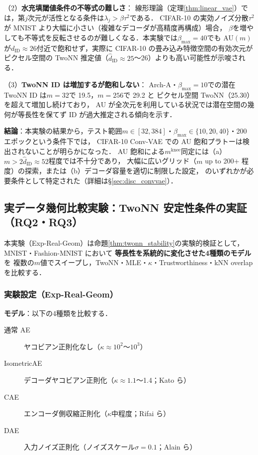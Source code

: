 \documentclass[11pt,a4paper]{jsarticle}
\newcommand{\kap}{\kappa}
\newcommand{\mknee}{m^{\mathrm{knee}}}
\begin{document}
（2）\textbf{水充填閾値条件の不等式の難しさ}：
線形理論（定理\ref{thm:linear_vae}）では，第$j$次元が活性となる条件は$\lambda_j > \beta \tau^2$である．
CIFAR-10 の実効ノイズ分散$\tau^2$が MNIST より大幅に小さい（複雑なデコーダが高精度再構成）場合，
$\beta$を増やしても不等式を反転させるのが難しくなる．本実験では$\beta_{\max}=40$でも
AU$(m)$が$d_{\mathrm{ID}} \approx 26$付近で飽和せず，実際に CIFAR-10 の畳み込み特徴空間の有効次元が
ピクセル空間の TwoNN 推定値（$\hat{d}_{\mathrm{ID}} \approx 25$〜26）よりも高い可能性が示唆される．

（3）\textbf{TwoNN ID は増加するが飽和しない}：
Arch-A・$\beta_{\max}=10$での潜在 TwoNN ID は$m=32$で 19.5，$m=256$で 29.2 と
ピクセル空間 TwoNN（25.30）を超えて増加し続けており，
AU が全次元を利用している状況では潜在空間の幾何が等長性を保てず ID が過大推定される傾向を示す．

\textbf{結論}：本実験の結果から，テスト範囲$m \in [32, 384]$・$\beta_{\max} \in \{10, 20, 40\}$・200 エポックという条件下では，
CIFAR-10 Conv-VAE での AU 飽和プラトーは検出されないことが明らかになった．
AU 飽和による$\mknee$同定には（a）$m > 2\hat{d}_{\mathrm{ID}} \approx 52$程度では不十分であり，
大幅に広いグリッド（$m$ up to 200+ 程度）の探索，または（b）デコーダ容量を適切に制限した設定，
のいずれかが必要条件として特定された（詳細は§\ref{sec:disc_convvae}）．

\subsection{実データ幾何比較実験：TwoNN 安定性条件の実証（RQ2・RQ3）}\label{sec:exp_real_geom}

本実験（Exp-Real-Geom）は命題\ref{thm:twonn_stability}の実験的検証として，
MNIST・Fashion-MNIST において \textbf{等長性を系統的に変化させた4種類のモデル}を
複数の$m$値でスイープし，TwoNN・MLE・$\kap$・Trustworthiness・kNN overlap を比較する．

\subsubsection*{実験設定（Exp-Real-Geom）}

\textbf{モデル}：以下の4種類を比較する．
\begin{description}
  \item[通常 AE] ヤコビアン正則化なし（$\kap \approx 10^2$〜$10^3$）
  \item[IsometricAE] デコーダヤコビアン正則化（$\kap \approx 1.1$〜1.4；Kato ら\cite{kato2020rdae}）
  \item[CAE] エンコーダ側収縮正則化（$\kap$中程度；Rifai ら\cite{rifai2011cae}）
  \item[DAE] 入力ノイズ正則化（ノイズスケール$\sigma=0.1$；Alain ら\cite{alain2014dae}）
\end{description}
\end{document}
